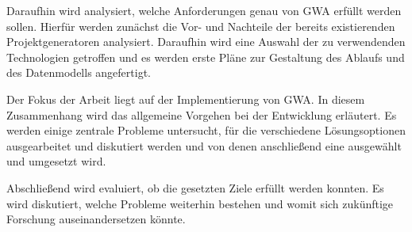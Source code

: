 Daraufhin wird analysiert, welche Anforderungen genau von \gls{GWA} erfüllt werden sollen. Hierfür werden zunächst die Vor- und Nachteile der bereits existierenden Projektgeneratoren analysiert. Daraufhin wird eine Auswahl der zu verwendenden Technologien getroffen und es werden erste Pläne zur Gestaltung des Ablaufs und des Datenmodells angefertigt.

Der Fokus der Arbeit liegt auf der Implementierung von \gls{GWA}. In diesem Zusammenhang wird das allgemeine Vorgehen bei der Entwicklung erläutert. Es werden einige zentrale Probleme untersucht, für die verschiedene Lösungsoptionen ausgearbeitet und diskutiert werden und von denen anschließend eine ausgewählt und umgesetzt wird.

Abschließend wird evaluiert, ob die gesetzten Ziele erfüllt werden konnten. Es wird diskutiert, welche Probleme weiterhin bestehen und womit sich zukünftige Forschung auseinandersetzen könnte.